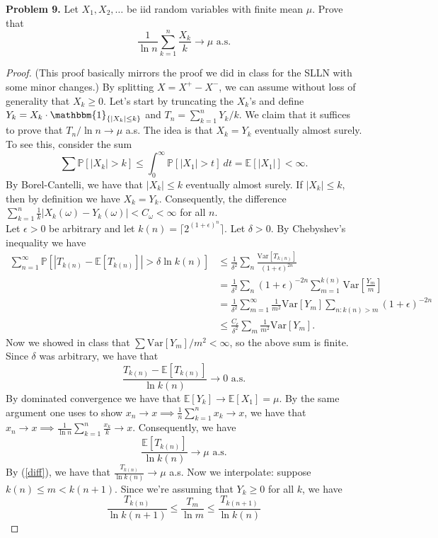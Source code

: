 \documentclass[11pt,letterpaper]{report}
\newcommand{\E}{\mathbb{E}}
\newcommand{\Prob}{\mathbb{P}}
\newcommand{\Var}{\text{Var}}
\newcommand{\ind}{\mathbbm{1}}
\begin{document}
\noindent\textbf{Problem 9. }
Let $X_1, X_2, \ldots$ be iid random variables with finite mean $\mu$. Prove that
\[
\frac{1}{\ln n}\sum_{k=1}^n\frac{X_k}{k}\to \mu\text{ a.s.}
\]
\begin{proof}
	(This proof basically mirrors the proof we did in class for the SLLN with some minor changes.) By splitting $X = X^+ - X^-$, we can assume without loss of generality that $X_k \geq 0$. Let's start by truncating the $X_k$'s and define $Y_k = X_k\cdot \ind_{\{|X_k|\leq k\}}$ and $T_n = \sum_{k=1}^n Y_k/k$. We claim that it suffices to prove that $T_n/\ln n \to \mu $ a.s. The idea is that $X_k = Y_k$ eventually almost surely. To see this, consider the sum
	\[
	\sum \Prob[|X_k| > k] \leq \int_0^\infty \Prob[|X_1|>t]\ dt = \E[|X_1|]<\infty.
	\]
	By Borel-Cantelli, we have that $|X_k|\leq k$ eventually almost surely. If $|X_k|\leq k$, then by definition we have $X_k = Y_k$. Consequently, the difference $\sum_{k=1}^n \frac{1}{k}|X_k(\omega) - Y_k(\omega)|<C_\omega<\infty$ for all $n$.\\

	\noindent Let $\epsilon>0$ be arbitrary and let $k(n) = \lceil 2^{(1+\epsilon)^n}\rceil$. Let $\delta>0$. By Chebyshev's inequality we have
	\begin{align*}
		\sum_{n = 1}^\infty \Prob[|T_{k(n)} - \E[T_{k(n)}]| > \delta \ln k(n)] &\leq \frac{1}{\delta^2}\sum_n \frac{\Var[T_{k(n)}]}{(1+\epsilon)^{2n}}\\
		&= \frac{1}{\delta^2}\sum_n (1+\epsilon)^{-2n}\sum_{m = 1}^{k(n)}\Var\left[\frac{Y_m}{m}\right]\\
		&= \frac{1}{\delta^2}\sum_{m=1}^\infty \frac{1}{m^2}\Var[Y_m]\sum_{n: k(n)>m}(1+\epsilon)^{-2n}\\
		&\leq \frac{C_\epsilon}{\delta^2}\sum_m\frac{1}{m^2}\Var[Y_m].
	\end{align*}
	Now we showed in class that $\sum \Var[Y_m]/m^2<\infty$, so the above sum is finite. Since $\delta$ was arbitrary, we have that
	\begin{equation}\label{diff}
	\frac{T_{k(n)} - \E[T_{k(n)}]}{\ln k(n)}\to 0\text{ a.s.}
	\end{equation}
	By dominated convergence we have that $\E[Y_k] \to \E[X_1] = \mu$. By the same argument one uses to show $x_n\to x \implies \frac{1}{n}\sum_{k=1}^n x_k \to x$, we have that $x_n\to x \implies \frac{1}{\ln n}\sum_{k=1}^n \frac{x_k}{k}\to x$. Consequently, we have
	\[
	\frac{\E[T_{k(n)}]}{\ln k(n)} \to \mu\text{ a.s.}
	\]
	By (\ref{diff}), we have that $\frac{T_{k(n)}}{\ln k(n)}\to \mu$ a.s. Now we interpolate: suppose $k(n)\leq m< k(n+1)$. Since we're assuming that $Y_k\geq 0$ for all $k$, we have
	\[
	\frac{T_{k(n)}}{\ln k(n+1)}\leq \frac{T_m}{\ln m}\leq \frac{T_{k(n+1)}}{\ln k(n)}
	\]
\end{proof}
\end{document}
